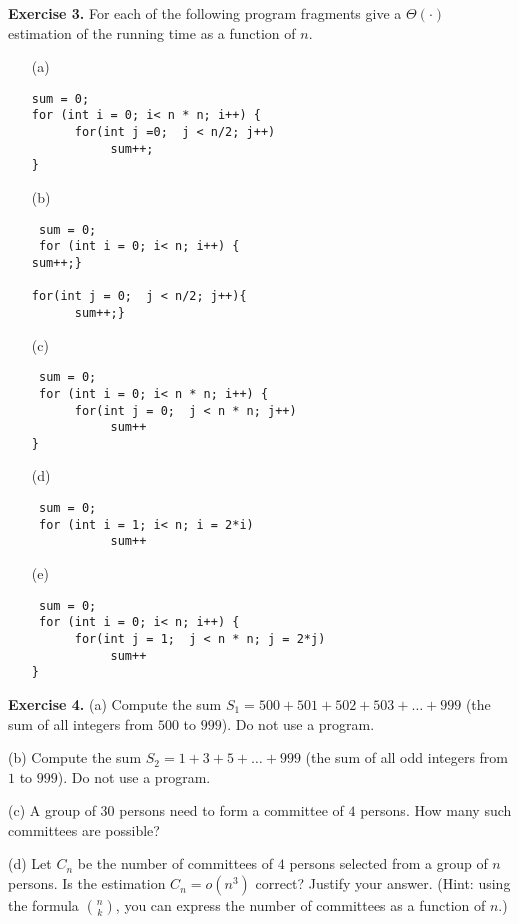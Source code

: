\documentclass[11pt]{article}
\begin{document}
\textbf{Exercise 3.}
For each of the following program fragments give a $\Theta(\cdot)$  estimation of the running time as a function of $n$.
\begin{itemize}
\item[(a)]
\begin{verbatim}
sum = 0;
for (int i = 0; i< n * n; i++) {
      for(int j =0;  j < n/2; j++)
    	   sum++;
}

\end{verbatim}
\item[(b)]
\begin{verbatim}
 sum = 0;
 for (int i = 0; i< n; i++) {
sum++;}

for(int j = 0;  j < n/2; j++){
      sum++;}

\end{verbatim}

\item[(c)]
\begin{verbatim}
 sum = 0;
 for (int i = 0; i< n * n; i++) {
      for(int j = 0;  j < n * n; j++)
           sum++
}
\end{verbatim}


\item[(d)]
\begin{verbatim}
 sum = 0;
 for (int i = 1; i< n; i = 2*i)
           sum++

\end{verbatim}


\item[(e)]
\begin{verbatim}
 sum = 0;
 for (int i = 0; i< n; i++) {
      for(int j = 1;  j < n * n; j = 2*j)
           sum++
}
\end{verbatim}


\end{itemize}
\bigskip

\textbf{Exercise 4.}
(a) Compute the sum $S_1 = 500 + 501+ 502 + 503 + \ldots + 999$ (the sum of all integers from $500$ to $999$). Do not use a program.
\smallskip

(b) Compute the sum $S_2 = 1 + 3 + 5 + \ldots + 999$  (the sum of all odd integers from $1$ to $999$).   Do not use a program.
\smallskip

(c) A group of $30$ persons need to form a committee of $4$ persons. How many such committees are possible?
\smallskip

(d) Let $C_n$ be the number of committees of $4$ persons selected from a group of $n$ persons.  Is the estimation
$C_n = o(n^3)$ correct? Justify your answer. (Hint: using the formula ${n \choose k}$, you can express the number of committees as a function of $n$.)
\bigskip
\end{document}
